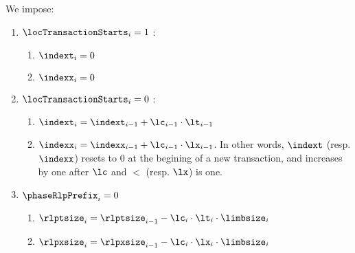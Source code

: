 We impose:
\begin{enumerate}
	\item \If $\locTransactionStarts_{i} = 1$ \Then:
        \begin{enumerate}
            \item $\indext_{i} = 0$ 
            \item $\indexx_{i} = 0$
        \end{enumerate}
    \item \If $\locTransactionStarts_{i} = 0$ \Then: 
        \begin{enumerate}
            \item $\indext_{i} = \indext_{i-1} + \lc_{i-1} \cdot \lt_{i-1}$ 
            \item $\indexx_{i} = \indexx_{i-1} + \lc_{i-1} \cdot \lx_{i-1}$. In other words, $\indext$ (resp. $\indexx$) resets to 0 at the begining of a new transaction, and increases by one after $\lc$ and $\lt$ (resp. $\lx$) is one.
        \end{enumerate}
      \item \If $\phaseRlpPrefix_{i} = 0$ \Then
        \begin{enumerate}
            \item $\rlptsize_{i} = \rlptsize_{i-1} - \lc_{i} \cdot \lt_{i} \cdot\limbsize_{i}$
            \item $\rlpxsize_{i} = \rlpxsize_{i-1} - \lc_{i} \cdot \lx_{i} \cdot\limbsize_{i}$
        \end{enumerate}
\end{enumerate}